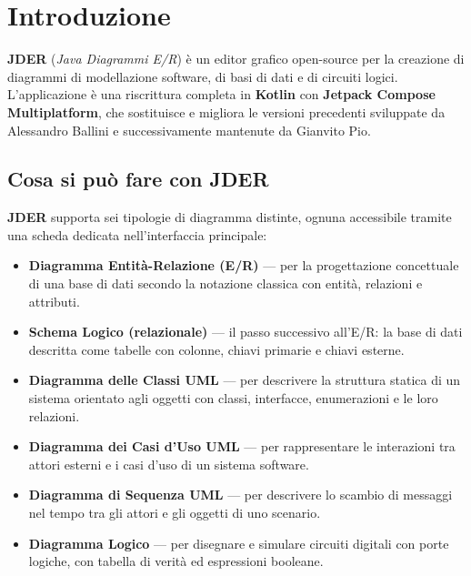 \documentclass[a4paper,11pt]{article}
\newcommand{\jder}{\textbf{JDER}}
\begin{document}
\tableofcontents
\newpage

\section{Introduzione}
\label{sec:intro}

\jder{} (\textit{Java Diagrammi E/R}) è un editor grafico open-source per la creazione di diagrammi
di modellazione software, di basi di dati e di circuiti logici. L'applicazione è una riscrittura completa in \textbf{Kotlin}
con \textbf{Jetpack Compose Multiplatform}, che sostituisce e migliora le versioni precedenti
sviluppate da Alessandro Ballini e successivamente mantenute da Gianvito Pio.

\subsection{Cosa si può fare con JDER}

\jder{} supporta sei tipologie di diagramma distinte, ognuna accessibile tramite una scheda
dedicata nell'interfaccia principale:

\begin{itemize}
  \item \textbf{Diagramma Entità-Relazione (E/R)} --- per la progettazione concettuale di una
        base di dati secondo la notazione classica con entità, relazioni e attributi.
  \item \textbf{Schema Logico (relazionale)} --- il passo successivo all'E/R: la base di dati
        descritta come tabelle con colonne, chiavi primarie e chiavi esterne.
  \item \textbf{Diagramma delle Classi UML} --- per descrivere la struttura statica di un sistema
        orientato agli oggetti con classi, interfacce, enumerazioni e le loro relazioni.
  \item \textbf{Diagramma dei Casi d'Uso UML} --- per rappresentare le interazioni tra attori
        esterni e i casi d'uso di un sistema software.
  \item \textbf{Diagramma di Sequenza UML} --- per descrivere lo scambio di messaggi nel tempo
        tra gli attori e gli oggetti di uno scenario.
  \item \textbf{Diagramma Logico} --- per disegnare e simulare circuiti digitali con porte
        logiche, con tabella di verità ed espressioni booleane.
\end{itemize}
\end{document}
